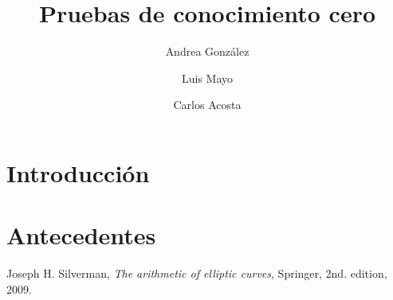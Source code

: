 \documentclass[oneside,10pt]{article}
\begin{document}
\author{Andrea González \and Luis Mayo \and Carlos Acosta}
\title{Pruebas de conocimiento cero}
\maketitle


\section{Introducción}
\blindtext \cite{silverman}

\blindtext

\section{Antecedentes}
\Blindtext


\begin{thebibliography}{99}
  Joseph H. Silverman,
  \emph{The arithmetic of elliptic curves},
  Springer,
  2nd. edition,
  2009.
\end{thebibliography}
\end{document}
